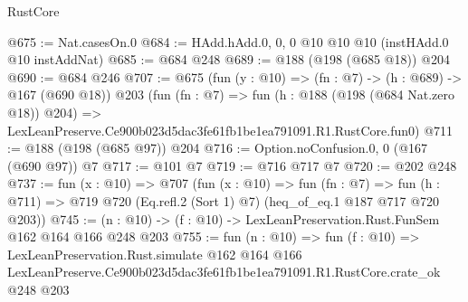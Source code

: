 \begin{lexlean}{RustCore}
\begin{coremodule}
@675 := Nat.casesOn.{0}
@684 := HAdd.hAdd.{0, 0, 0} @10 @10 @10 (instHAdd.{0} @10 instAddNat)
@685 := @684 @248
@689 := @188 (@198 (@685 @18)) @204
@690 := @684 @246
@707 := @675
    (fun (y : @10) => (fn : @7) -> (h : @689) -> @167 (@690 @18))
    @203
    (fun (fn : @7) =>
    fun (h : @188 (@198 (@684 Nat.zero @18)) @204) =>
    LexLeanPreserve.Ce900b023d5dac3fe61fb1be1ea791091.R1.RustCore.fun0)
@711 := @188 (@198 (@685 @97)) @204
@716 := Option.noConfusion.{0, 0} (@167 (@690 @97)) @7
@717 := @101 @7
@719 := @716 @717 @7
@720 := @202 @248
@737 := fun (x : @10) =>
  @707
    (fun (x : @10) =>
    fun (fn : @7) =>
    fun (h : @711) => @719 @720 (Eq.refl.{2} (Sort 1) @7) (heq_of_eq.{1} @187 @717 @720 @203))
@745 := (n : @10) -> (f : @10) -> LexLeanPreservation.Rust.FunSem @162 @164 @166 @248 @203
@755 := fun (n : @10) =>
  fun (f : @10) =>
  LexLeanPreservation.Rust.simulate
    @162
    @164
    @166
    LexLeanPreserve.Ce900b023d5dac3fe61fb1be1ea791091.R1.RustCore.crate_ok
    @248
    @203
\end{coremodule}
\end{lexlean}
